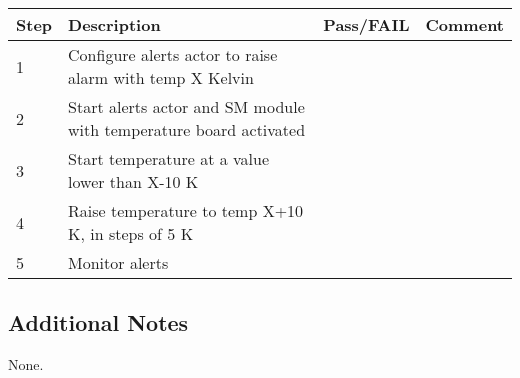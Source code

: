 \begin{table}[H]
    \begin{tabular}{|l| p{5cm} |l| p{5cm} |}
    \hline
    {\bf Step} & {\bf Description} & {\bf Pass/FAIL} & {\bf Comment}  \\ \hline
    1 & Configure alerts actor to raise alarm with temp X Kelvin &  &  \\ \hline
    2 & Start alerts actor and SM module with temperature board activated &  & \\ \hline
    3 & Start temperature at a value lower than X-10 K &  & \\ \hline
    4 & Raise temperature to temp X+10 K, in steps of 5 K &  & \\ \hline
    5 & Monitor alerts &  & \\ \hline
    \end{tabular}
\end{table}


\subsection{Additional Notes}

None.
